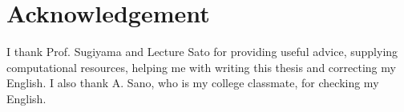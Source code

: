 \documentclass[senior,final,11pt]{iscs-thesis}
\begin{document}
\chapter{Acknowledgement}
I thank Prof. Sugiyama and Lecture Sato for providing useful advice, supplying computational resources, helping me with writing this thesis and 
correcting my English.
I also thank A. Sano, who is my college classmate, for checking my English.



\end{document}
